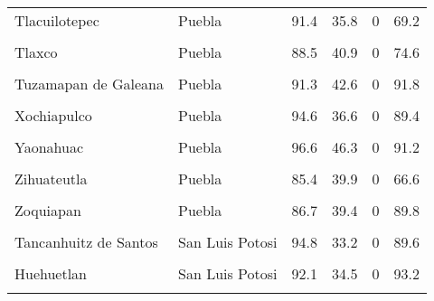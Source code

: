 \documentclass[
]{report}
\begin{document}
\begin{longtable}[t]{llrrrr}
\addlinespace
Tlacuilotepec & Puebla & 91.4 & 35.8 & 0 & 69.2\\
\cellcolor{gray!6}{Tlapacoya} & \cellcolor{gray!6}{Puebla} & \cellcolor{gray!6}{82.3} & \cellcolor{gray!6}{35.3} & \cellcolor{gray!6}{0} & \cellcolor{gray!6}{72.1}\\
Tlaxco & Puebla & 88.5 & 40.9 & 0 & 74.6\\
\cellcolor{gray!6}{Totoltepec de Guerrero} & \cellcolor{gray!6}{Puebla} & \cellcolor{gray!6}{97.6} & \cellcolor{gray!6}{33.6} & \cellcolor{gray!6}{0} & \cellcolor{gray!6}{58.7}\\
Tuzamapan de Galeana & Puebla & 91.3 & 42.6 & 0 & 91.8\\
\addlinespace
\cellcolor{gray!6}{Xayacatlan de Bravo} & \cellcolor{gray!6}{Puebla} & \cellcolor{gray!6}{94.9} & \cellcolor{gray!6}{37.9} & \cellcolor{gray!6}{0} & \cellcolor{gray!6}{93.2}\\
Xochiapulco & Puebla & 94.6 & 36.6 & 0 & 89.4\\
\cellcolor{gray!6}{Xochitlan de Vicente Suarez} & \cellcolor{gray!6}{Puebla} & \cellcolor{gray!6}{81.3} & \cellcolor{gray!6}{37.0} & \cellcolor{gray!6}{0} & \cellcolor{gray!6}{94.6}\\
Yaonahuac & Puebla & 96.6 & 46.3 & 0 & 91.2\\
\cellcolor{gray!6}{Zautla} & \cellcolor{gray!6}{Puebla} & \cellcolor{gray!6}{91.9} & \cellcolor{gray!6}{36.4} & \cellcolor{gray!6}{0} & \cellcolor{gray!6}{83.1}\\
\addlinespace
Zihuateutla & Puebla & 85.4 & 39.9 & 0 & 66.6\\
\cellcolor{gray!6}{Zongozotla} & \cellcolor{gray!6}{Puebla} & \cellcolor{gray!6}{82.6} & \cellcolor{gray!6}{45.1} & \cellcolor{gray!6}{0} & \cellcolor{gray!6}{97.0}\\
Zoquiapan & Puebla & 86.7 & 39.4 & 0 & 89.8\\
\cellcolor{gray!6}{Toliman} & \cellcolor{gray!6}{Queretaro} & \cellcolor{gray!6}{95.8} & \cellcolor{gray!6}{42.8} & \cellcolor{gray!6}{0} & \cellcolor{gray!6}{82.2}\\
Tancanhuitz de Santos & San Luis Potosi & 94.8 & 33.2 & 0 & 89.6\\
\addlinespace
\cellcolor{gray!6}{Coxcatlan} & \cellcolor{gray!6}{San Luis Potosi} & \cellcolor{gray!6}{94.0} & \cellcolor{gray!6}{35.1} & \cellcolor{gray!6}{0} & \cellcolor{gray!6}{97.7}\\
Huehuetlan & San Luis Potosi & 92.1 & 34.5 & 0 & 93.2\\
\cellcolor{gray!6}{San Antonio} & \cellcolor{gray!6}{San Luis Potosi} & \cellcolor{gray!6}{94.4} & \cellcolor{gray!6}{31.0} & \cellcolor{gray!6}{0} & \cellcolor{gray!6}{97.7}\\

\end{longtable}
\end{document}

